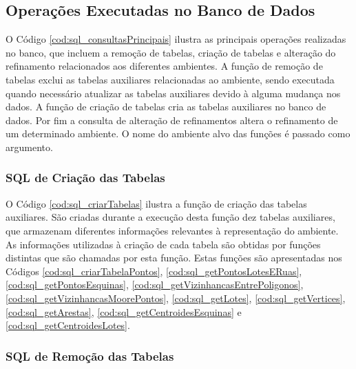 \newpage

\subsection{Operações Executadas no Banco de Dados}

O Código \ref{cod:sql_consultasPrincipais} ilustra as principais operações realizadas no banco, que incluem a remoção de tabelas, criação de tabelas e alteração do refinamento relacionados aos diferentes ambientes. A função de remoção de tabelas exclui as tabelas auxiliares relacionadas ao ambiente, sendo executada quando necessário atualizar as tabelas auxiliares devido à alguma mudança nos dados. A função de criação de tabelas cria as tabelas auxiliares no banco de dados. Por fim a consulta de alteração de refinamentos altera o refinamento de um determinado ambiente. O nome do ambiente alvo das funções é passado como argumento.



\subsubsection{SQL de Criação das Tabelas}

O Código \ref{cod:sql_criarTabelas} ilustra a função de criação das tabelas auxiliares. São criadas durante a execução desta função dez tabelas auxiliares, que armazenam diferentes informações relevantes à representação do ambiente. As informações utilizadas à criação de cada tabela são obtidas por funções distintas que são chamadas por esta função. Estas funções são apresentadas nos Códigos \ref{cod:sql_criarTabelaPontos}, \ref{cod:sql_getPontosLotesERuas}, \ref{cod:sql_getPontosEsquinas}, \ref{cod:sql_getVizinhancasEntrePoligonos}, \ref{cod:sql_getVizinhancasMoorePontos}, \ref{cod:sql_getLotes}, \ref{cod:sql_getVertices}, \ref{cod:sql_getArestas}, \ref{cod:sql_getCentroidesEsquinas} e \ref{cod:sql_getCentroidesLotes}.



\subsubsection{SQL de Remoção das Tabelas}

